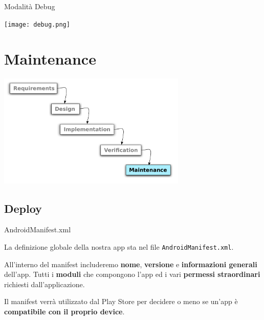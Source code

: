 \documentclass[xcolor=svgnames,11pt]{beamer}
\begin{document}
\begin{frame}{Modalit\`a Debug}
\begin{center}
\texttt{[image: debug.png]}
\end{center}
\end{frame}

\section{Maintenance}

\begin{frame}
\begin{center}
\includegraphics[width=9cm]{waterfall_5.pdf}
\end{center}
\end{frame}

\subsection{Deploy}
\begin{frame}{AndroidManifest.xml}

La definizione globale della nostra app sta nel file \texttt{AndroidManifest.xml}.

\medskip
\pause

All'interno del manifest includeremo \textbf{nome}, \textbf{versione} e \textbf{informazioni generali} dell'app. Tutti i \textbf{moduli} che compongono l'app ed i vari \textbf{permessi straordinari} richiesti dall'applicazione.

\medskip
\pause

\begin{block}{}
Il manifest verr\`a utilizzato dal Play Store per decidere o meno se un'app \`e \textbf{compatibile con il proprio device}.
\end{block}
\end{frame}
\end{document}
